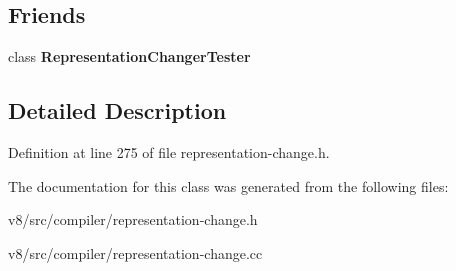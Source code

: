 \subsection*{Friends}
\begin{DoxyCompactItemize}
\item 
\mbox{\label{classv8_1_1internal_1_1compiler_1_1RepresentationChanger_a5656d08ac32912064eddbf38094fd134}} 
class {\bfseries Representation\+Changer\+Tester}
\end{DoxyCompactItemize}


\subsection{Detailed Description}


Definition at line 275 of file representation-\/change.\+h.



The documentation for this class was generated from the following files\+:\begin{DoxyCompactItemize}
\item 
v8/src/compiler/representation-\/change.\+h\item 
v8/src/compiler/representation-\/change.\+cc\end{DoxyCompactItemize}
